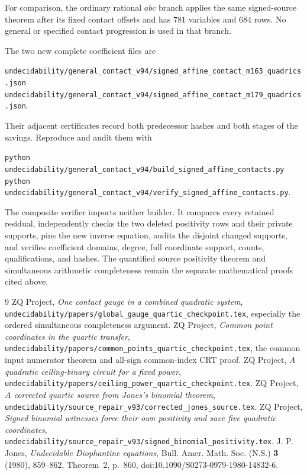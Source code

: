 \documentclass[11pt]{article}
\begin{document}
For comparison, the ordinary rational $abc$ branch applies the same
signed-source theorem after its fixed contact offsets and has $781$
variables and $684$ rows. No general or specified contact progression
is used in that branch.

The two new complete coefficient files are
\begin{center}\small
\nolinkurl{undecidability/general_contact_v94/signed_affine_contact_m163_quadrics.json}\\
\nolinkurl{undecidability/general_contact_v94/signed_affine_contact_m179_quadrics.json}.
\end{center}
Their adjacent certificates record both predecessor hashes and both
stages of the savings. Reproduce and audit them with
\begin{center}\small
\texttt{python undecidability/general\_contact\_v94/build\_signed\_affine\_contacts.py}\\
\texttt{python undecidability/general\_contact\_v94/verify\_signed\_affine\_contacts.py}.
\end{center}
The composite verifier imports neither builder. It compares every
retained residual, independently checks the two deleted positivity
rows and their private supports, pins the new inverse equation,
audits the disjoint changed supports, and verifies coefficient domains,
degree, full coordinate support, counts, qualifications, and hashes.
The quantified source positivity theorem and simultaneous arithmetic
completeness remain the separate mathematical proofs cited above.

\begin{thebibliography}{9}
ZQ Project, \emph{One contact gauge in a combined quadratic system},
\nolinkurl{undecidability/papers/global_gauge_quartic_checkpoint.tex},
especially the ordered simultaneous completeness argument.
ZQ Project, \emph{Common point coordinates in the quartic transfer},
\nolinkurl{undecidability/papers/common_points_quartic_checkpoint.tex},
the common input numerator theorem and all-sign common-index CRT proof.
ZQ Project, \emph{A quadratic ceiling-binary circuit for a fixed power},
\nolinkurl{undecidability/papers/ceiling_power_quartic_checkpoint.tex}.
ZQ Project, \emph{A corrected quartic source from Jones's binomial theorem},
\nolinkurl{undecidability/source_repair_v93/corrected_jones_source.tex}.
ZQ Project, \emph{Signed binomial witnesses force their own positivity
and save five quadratic coordinates},
\nolinkurl{undecidability/source_repair_v93/signed_binomial_positivity.tex}.
J. P. Jones, \emph{Undecidable Diophantine equations},
Bull. Amer. Math. Soc. (N.S.) \textbf{3} (1980), 859--862,
Theorem~2, p.~860, doi:10.1090/S0273-0979-1980-14832-6.
\end{thebibliography}
\end{document}
